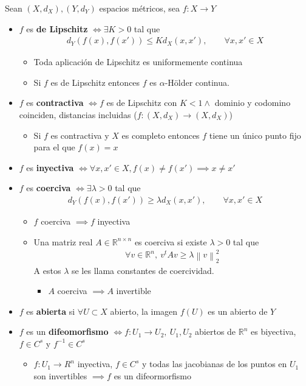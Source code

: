 \documentclass[a4paper,twocolumn]{extarticle}
\newcommand{\R}{\mathbb{R}}
\newcommand{\norma}[1]{\left\lVert#1\right\rVert}
\begin{document}
Sean $(X, d_X), (Y, d_Y)$ espacios métricos, sea $f:X \to Y$
\begin{itemize}
	\item $f$ es \textbf{de Lipschitz} $\iff \exists K > 0$ tal que
	\begin{align*}
		d_Y(f(x), f(x')) \leq K d_X(x,x'),\qquad \forall x,x' \in X
	\end{align*}
	\begin{itemize}
		\item Toda aplicación de Lipschitz es uniformemente continua
		\item Si $f$ es de Lipschitz entonces $f$ es $\alpha$-Hölder continua.
	\end{itemize}

	\item $f$ es \textbf{contractiva} $\iff f$ es de Lipschitz con $K < 1 \land$ dominio y codomino coinciden, distancias incluidas ($f:(X, d_X) \to (X, d_X)$)
	\begin{itemize}
		\item Si $f$ es contractiva y $X$ es completo entonces $f$ tiene un único punto fijo para el que $f(x) = x$
	\end{itemize}
	
	\item $f$ es \textbf{inyectiva} $\iff \forall x,x' \in X, f(x) \neq f(x') \implies x \neq x'$
	
	\item $f$ es \textbf{coerciva} $\iff \exists \lambda > 0$ tal que
	\begin{align*}
		d_Y(f(x), f(x')) \geq \lambda d_X(x,x'),\qquad \forall x,x' \in X
	\end{align*}
	\begin{itemize}
		\item $f$ coerciva $\implies f$ inyectiva
		\item Una matriz real $A \in \R^{n\times n}$ es coerciva si existe $\lambda > 0$ tal que
		\begin{align*}
			\forall v \in \R^n,\ v^tAv \geq \lambda \norma{v}_2^2
		\end{align*}
		A estos $\lambda$ se les llama constantes de coercividad.
		\begin{itemize}
			\item $A$ coerciva $\implies A$ invertible
		\end{itemize}
	\end{itemize}
	\item $f$ es \textbf{abierta} si $\forall U \subset X$ abierto, la imagen $f(U)$ es un abierto de $Y$
	\item $f$ es un \textbf{difeomorfismo} $\iff f: U_1 \to U_2,\ U_1,U_2$ abiertos de $\R^n$ es biyectiva, $f \in C^s$ y $f^{-1} \in C^s$
	\begin{itemize}
		\item $f:U_1 \to R^n$ inyectiva, $f \in C^s$ y todas las jacobianas de los puntos en $U_1$ son invertibles $\implies f$ es un difeormorfismo
	\end{itemize}
\end{itemize}
\end{document}
